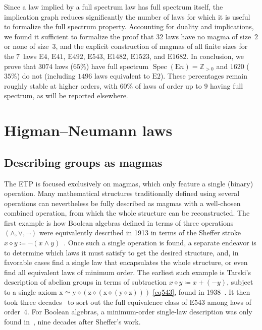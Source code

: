 \documentclass[12pt]{amsart}
\theoremstyle{definition}
\newcommand{\x}{\mathrm{x}}
\newcommand{\y}{\mathrm{y}}
\newcommand{\z}{\mathrm{z}}
\newcommand{\op}{\diamond}
\newcommand{\formaleq}{\simeq}
\newcommand{\Eq}[1]{\mathrm{E}#1}
\begin{document}
Since a law implied by a full spectrum law has full spectrum itself, the implication graph reduces significantly the number of laws for which it is useful to formalize the full spectrum property.  Accounting for duality and implications, we found it sufficient to formalize the proof that $32$ laws have no magma of size~$2$ or none of size~$3$, and the explicit construction of magmas of all finite sizes for the $7$~laws $\Eq{4}$, $\Eq{41}$, $\Eq{492}$, $\Eq{543}$, $\Eq{1482}$, $\Eq{1523}$, and $\Eq{1682}$.  In conclusion, we prove that $\num{3074}$ laws ($65\%$) have full spectrum $\operatorname{Spec}(\Eq{n})=\mathbb{Z}_{>0}$ and $\num{1620}$ ($35\%$) do not (including $\num{1496}$ laws equivalent to $\Eq{2}$).  These percentages remain roughly stable at higher orders, with $60\%$ of laws of order up to $9$ having full spectrum, as will be reported elsewhere.

\section{Higman--Neumann laws}\label{higman-neumann}

\subsection{Describing groups as magmas}

The ETP is focused exclusively on magmas, which only feature a single (binary) operation.  Many mathematical structures traditionally defined using several operations can nevertheless be fully described as magmas with a well-chosen combined operation, from which the whole structure can be reconstructed.  The first example is how Boolean algebras defined in terms of three operations $(\land,\lor,\lnot)$ were equivalently described in 1913 in terms of the Sheffer stroke $x\op y\coloneqq \lnot(x\land y)$~\cite{sheffer}.  Once such a single operation is found, a separate endeavor is to determine which laws it must satisfy to get the desired structure, and, in favorable cases find a single law that encapsulates the whole structure, or even find all equivalent laws of minimum order.  The earliest such example is Tarski's description of abelian groups in terms of subtraction $x\op y\coloneqq x+(-y)$, subject to a single axiom $\x \formaleq \y \op (\z \op (\x \op (\y \op \z)))$ \eqref{eq543}, found in 1938~\cite{Tarski1938}.  It then took three decades~\cite{higman-neumann,Sholander01021959,Padmanabhan_1969} to sort out the full equivalence class of $\Eq{543}$ among laws of order~$4$.  For Boolean algebras, a minimum-order single-law description was only found in~\cite{mccune_et_al}, nine decades after Sheffer's work.
\end{document}

